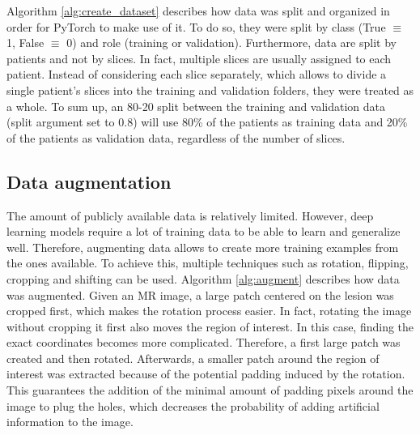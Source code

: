 Algorithm \ref{alg:create_dataset} describes how data was split and organized in order for PyTorch to make use of it. To do so, they were split by class (True $\equiv$ 1, False $\equiv$ 0) and role (training or validation). Furthermore, data are split by patients and not by slices. In fact, multiple slices are usually assigned to each patient. Instead of considering each slice separately, which allows to divide a single patient's slices into the training and validation folders, they were treated as a whole. To sum up, an 80-20 split between the training and validation data (split argument set to $0.8$) will use 80\% of the patients as training data and 20\% of the patients as validation data, regardless of the number of slices.


\subsection{Data augmentation}

The amount of publicly available data is relatively limited. However, deep learning models require a lot of training data to be able to learn and generalize well. Therefore, augmenting data allows to create more training examples from the ones available. To achieve this, multiple techniques such as rotation, flipping, cropping and shifting can be used. Algorithm \ref{alg:augment} describes how data was augmented. Given an MR image, a large patch centered on the lesion was cropped first, which makes the rotation process easier. In fact, rotating the image without cropping it first also moves the region of interest. In this case, finding the exact coordinates becomes more complicated. Therefore, a first large patch was created and then rotated. Afterwards, a smaller patch around the region of interest was extracted because of the potential padding induced by the rotation. This guarantees the addition of the minimal amount of padding pixels around the image to plug the holes, which decreases the probability of adding artificial information to the image.

